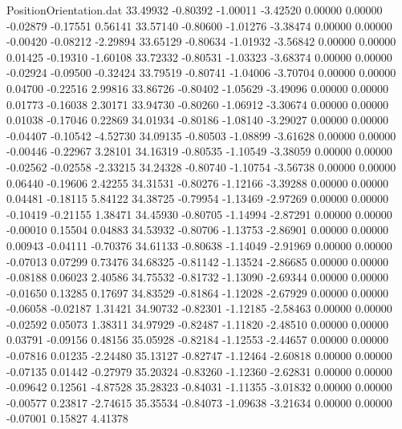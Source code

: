 \begin{filecontents}{PositionOrientation.dat}
  33.49932   -0.80392   -1.00011    -3.42520    0.00000    0.00000   -0.02879   -0.17551    0.56141
  33.57140   -0.80600   -1.01276    -3.38474    0.00000    0.00000   -0.00420   -0.08212   -2.29894
  33.65129   -0.80634   -1.01932    -3.56842    0.00000    0.00000    0.01425   -0.19310   -1.60108
  33.72332   -0.80531   -1.03323    -3.68374    0.00000    0.00000   -0.02924   -0.09500   -0.32424
  33.79519   -0.80741   -1.04006    -3.70704    0.00000    0.00000    0.04700   -0.22516    2.99816
  33.86726   -0.80402   -1.05629    -3.49096    0.00000    0.00000    0.01773   -0.16038    2.30171
  33.94730   -0.80260   -1.06912    -3.30674    0.00000    0.00000    0.01038   -0.17046    0.22869
  34.01934   -0.80186   -1.08140    -3.29027    0.00000    0.00000   -0.04407   -0.10542   -4.52730
  34.09135   -0.80503   -1.08899    -3.61628    0.00000    0.00000   -0.00446   -0.22967    3.28101
  34.16319   -0.80535   -1.10549    -3.38059    0.00000    0.00000   -0.02562   -0.02558   -2.33215
  34.24328   -0.80740   -1.10754    -3.56738    0.00000    0.00000    0.06440   -0.19606    2.42255
  34.31531   -0.80276   -1.12166    -3.39288    0.00000    0.00000    0.04481   -0.18115    5.84122
  34.38725   -0.79954   -1.13469    -2.97269    0.00000    0.00000   -0.10419   -0.21155    1.38471
  34.45930   -0.80705   -1.14994    -2.87291    0.00000    0.00000   -0.00010    0.15504    0.04883
  34.53932   -0.80706   -1.13753    -2.86901    0.00000    0.00000    0.00943   -0.04111   -0.70376
  34.61133   -0.80638   -1.14049    -2.91969    0.00000    0.00000   -0.07013    0.07299    0.73476
  34.68325   -0.81142   -1.13524    -2.86685    0.00000    0.00000   -0.08188    0.06023    2.40586
  34.75532   -0.81732   -1.13090    -2.69344    0.00000    0.00000   -0.01650    0.13285    0.17697
  34.83529   -0.81864   -1.12028    -2.67929    0.00000    0.00000   -0.06058   -0.02187    1.31421
  34.90732   -0.82301   -1.12185    -2.58463    0.00000    0.00000   -0.02592    0.05073    1.38311
  34.97929   -0.82487   -1.11820    -2.48510    0.00000    0.00000    0.03791   -0.09156    0.48156
  35.05928   -0.82184   -1.12553    -2.44657    0.00000    0.00000   -0.07816    0.01235   -2.24480
  35.13127   -0.82747   -1.12464    -2.60818    0.00000    0.00000   -0.07135    0.01442   -0.27979
  35.20324   -0.83260   -1.12360    -2.62831    0.00000    0.00000   -0.09642    0.12561   -4.87528
  35.28323   -0.84031   -1.11355    -3.01832    0.00000    0.00000   -0.00577    0.23817   -2.74615
  35.35534   -0.84073   -1.09638    -3.21634    0.00000    0.00000   -0.07001    0.15827    4.41378

\end{filecontents}
